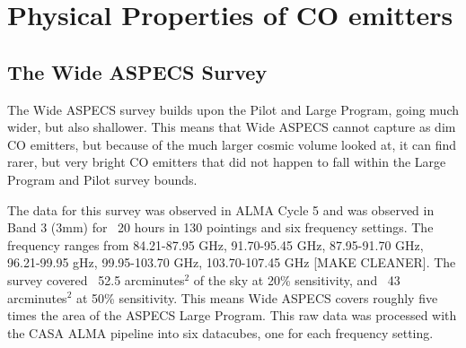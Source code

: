 \chapter{Physical Properties of CO emitters}

\section{The Wide ASPECS Survey}

The Wide ASPECS survey builds upon the Pilot and Large Program, going much wider, but also shallower. This means that Wide ASPECS cannot capture as dim CO emitters, but because of the much larger cosmic volume looked at, it can find rarer, but very bright CO emitters that did not happen to fall within the Large Program and Pilot survey bounds.

The data for this survey was observed in ALMA Cycle 5 and was observed in Band 3 (3mm) for ~20 hours in 130 pointings and six frequency settings. The frequency ranges from 84.21-87.95 GHz, 91.70-95.45 GHz, 87.95-91.70 GHz, 96.21-99.95 gHz, 99.95-103.70 GHz, 103.70-107.45 GHz [MAKE CLEANER]. The survey covered ~52.5 arcminutes$^2$ of the sky at 20\% sensitivity, and ~43 arcminutes$^2$ at 50\% sensitivity. This means Wide ASPECS covers roughly five times the area of the ASPECS Large Program. This raw data was processed with the CASA ALMA pipeline into six datacubes, one for each frequency setting.

